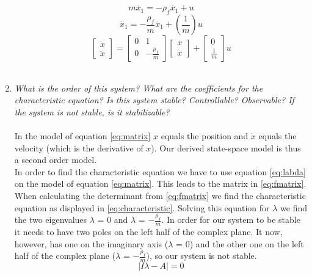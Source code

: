 \documentclass[final]{scrreprt} %
\begin{document}
\begin{enumerate}
\begin{equation}
	m \ddot{x_{1}} = -\rho_f \dot{x_{1}} +\textit{u}
	\label{eq:motion}
\end{equation}
\begin{equation}
	\ddot{x_{1}} = -\frac{\rho_f}{m} \dot{x_{1}} +(\frac{1}{m})\textit{u}
	\label{eq:switch}
\end{equation}
\begin{equation}
	\begin{bmatrix}
		\dot{x} \\
		\ddot{x}
	\end{bmatrix} =
	\begin{bmatrix}
		0 & 1 \\
		0 & -\frac{\rho_f}{m}
	\end{bmatrix}
	\begin{bmatrix}
		x \\
		\dot{x}
	\end{bmatrix} +
	\begin{bmatrix}
		0 \\
		\frac{1}{m}
	\end{bmatrix}
	\textit{u}
	\label{eq:matrix}
\end{equation}
\\
\item \textit{What is the order of this system? What are the coefficients for the characteristic equation? Is this system stable? Controllable? Observable? If the system is not stable, is it stabilizable?}
\label{ref:task12}\\
\\
 In the model of equation \ref{eq:matrix} $x$ equals the position and $\dot{x}$ equals the velocity (which is the derivative of $x$). Our derived state-space model is thus a second order model. \\
In order to find the characteristic equation we have to use equation \ref{eq:labda} on the model of equation \ref{eq:matrix}. This leads to the matrix in \ref{eq:fmatrix}. When calculating the determinant from \ref{eq:fmatrix} we find the characteristic equation as displayed in \ref{eq:characteristic}. Solving this equation for $\lambda$ we find the two eigenvalues $\lambda$ =  $0$ and $\lambda$ = $-\frac{\rho_f}{m}$. In order for our system to be stable it needs to have two poles on the left half of the complex plane. It now, however, has one on the imaginary axis ($\lambda$ = $0$) and the other one on the left half of the complex plane ($\lambda$ = $-\frac{\rho_f}{m}$), so our system is not stable.\\
\begin{equation}
	\left| I \lambda - A \right| = 0
	\label{eq:labda}
\end{equation}


\end{enumerate}
\end{document}
